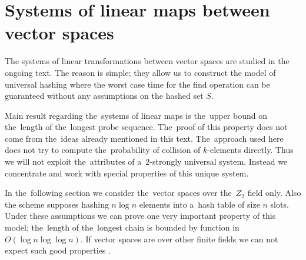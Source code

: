 \chapter{Systems of linear maps between vector spaces}
The systems of linear transformations between vector spaces are studied in the ongoing text. The reason is simple; they allow us to construct the model of universal hashing where the worst case time for the find operation can be guaranteed without any assumptions on the hashed set $S$. 

Main result regarding the~systems of linear maps is the~upper bound on the~length of the~longest probe sequence. The~proof of this property does not come from the~ideas already mentioned in this text. The~approach used here does not try to compute the~probability of collision of $k$-elements directly. Thus we will not exploit the~attributes of a~$2$-strongly universal system. Instead we concentrate and work with special properties of this unique system.

In the~following section we consider the~vector spaces over the~$Z_2$ field only. Also the scheme supposes hashing $n \log n$ elements into a~hash table of size $n$ slots. Under these assumptions we can prove one very important property of this model; the~length of the~longest chain is bounded by function in $O(\log n \log \log n)$. If vector spaces are over other finite fields we can not expect such good properties \cite{linear-hash-functions}.

